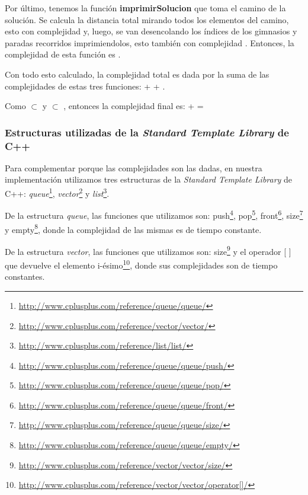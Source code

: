 Por último, tenemos la función \textbf{imprimirSolucion} que toma el camino de la solución. Se calcula la distancia total mirando todos los elementos del camino, esto con complejidad  y, luego, se van desencolando los índices de los gimnasios y paradas recorridos imprimiendolos, esto también con complejidad . Entonces, la complejidad de esta función es .


Con todo esto calculado, la complejidad total es dada por la suma de las complejidades de estas tres funciones:  +  + . 

Como  $\subset$  y  $\subset$ , entonces la complejidad final es:  +  = 

\subsubsection{Estructuras utilizadas de la \textit{Standard Template Library} de C++}

Para complementar porque las complejidades son las dadas, en nuestra implementación utilizamos tres estructuras de la \textit{Standard Template Library} de C++: \emph{queue}\footnote{\url{http://www.cplusplus.com/reference/queue/queue/}}, \emph{vector}\footnote{\url{http://www.cplusplus.com/reference/vector/vector/}} y \emph{list}\footnote{\url{http://www.cplusplus.com/reference/list/list/}}.

De la estructura \emph{queue}, las funciones que utilizamos son: push\footnote{\url{http://www.cplusplus.com/reference/queue/queue/push/}}, pop\footnote{\url{http://www.cplusplus.com/reference/queue/queue/pop/}}, front\footnote{\url{http://www.cplusplus.com/reference/queue/queue/front/}}, size\footnote{\url{http://www.cplusplus.com/reference/queue/queue/size/}} y empty\footnote{\url{http://www.cplusplus.com/reference/queue/queue/empty/}}, donde la complejidad de las mismas es de tiempo constante.

De la estructura \emph{vector}, las funciones que utilizamos son: size\footnote{\url{http://www.cplusplus.com/reference/vector/vector/size/}} y el operador [ ] que devuelve el elemento i-ésimo\footnote{\url{http://www.cplusplus.com/reference/vector/vector/operator[]/}}, donde sus complejidades son de tiempo constantes.


